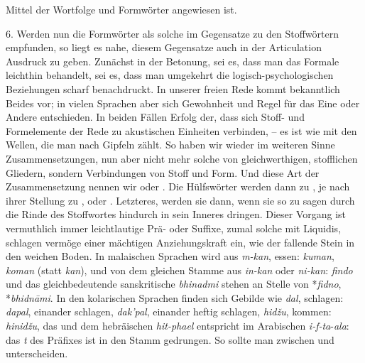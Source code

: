 Mittel der Wortfolge und Formwörter angewiesen ist.

\label{IV.III.II.4.6}6. Werden nun die Formwörter als solche im Gegensatze zu den Stoffwörtern empfunden, so liegt es nahe, diesem Gegensatze auch in der Articulation Ausdruck zu geben. Zunächst in der Betonung, sei es, dass man das Formale leichthin behandelt, sei es, dass man umgekehrt die logisch-psychologischen Beziehungen scharf benachdruckt. In unserer freien Rede kommt bekanntlich Beides vor; in vielen Sprachen aber  sich Gewohnheit und Regel für das Eine oder Andere entschieden. In beiden Fällen  Erfolg der, dass sich Stoff- \label{sp.348} und Formelemente der Rede zu akustischen Einheiten verbinden, – es ist wie mit den Wellen, die man nach Gipfeln zählt. So haben wir wieder im weiteren Sinne Zusammensetzungen, nun aber nicht mehr solche von gleichwerthigen, stofflichen Gliedern, sondern Verbindungen von Stoff und Form. Und diese Art der Zusammensetzung nennen wir  oder . Die Hülfswörter werden dann zu , je nach ihrer  Stellung zu ,  oder . Letzteres,  werden sie dann, wenn sie so zu sagen durch die Rinde des Stoffwortes hindurch in sein Inneres dringen. Dieser Vorgang ist vermuthlich immer  leichtlautige Prä- oder Suffixe, zumal solche mit Liquidis, schlagen vermöge einer mächtigen Anziehungskraft ein, wie der fallende Stein in den weichen Boden. In malaischen Sprachen wird aus \textit{m-kan}, essen: \textit{kuman}, \textit{koman} (statt \textit{kan}), und von dem gleichen Stamme aus \textit{in-kan} oder \textit{ni-kan}:  \textit{findo} und das gleichbedeutende sanskritische \textit{bhinadmi} stehen an Stelle von *\textit{fidno}, *\textit{bhidnāmi}. In den kolarischen Sprachen finden sich Gebilde wie \textit{dal}, schlagen: \textit{dapal}, einander schlagen, \textit{dak’pal}, einander heftig schlagen, \textit{hidžu}, kommen: \textit{hinidžu}, das  und dem hebräischen \textit{hit-pha}{\ain}\textit{el} entspricht im Arabischen \textit{i-f-ta}{}-{\ain}\textit{ala}: das \textit{t} des Präfixes ist in den Stamm gedrungen. So sollte man zwischen  und  unterscheiden.

